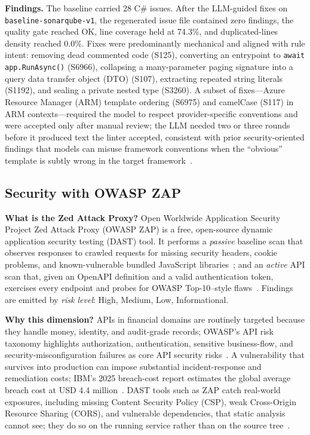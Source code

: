 \documentclass[conference,letterpaper]{IEEEtran}
\begin{document}
\textbf{Findings.} The baseline carried 28 C\# issues. After the LLM-guided fixes on \texttt{baseline-sonarqube-v1}, the regenerated issue file contained zero findings, the quality gate reached \textsc{OK}, line coverage held at 74.3\%, and duplicated-lines density reached 0.0\%. Fixes were predominantly mechanical and aligned with rule intent: removing dead commented code (\textsc{S125}), converting an entrypoint to \texttt{await app.RunAsync()} (\textsc{S6966}), collapsing a many-parameter paging signature into a query data transfer object (DTO) (\textsc{S107}), extracting repeated string literals (\textsc{S1192}), and sealing a private nested type (\textsc{S3260}). A subset of fixes---Azure Resource Manager (ARM) template ordering (\textsc{S6975}) and camelCase (\textsc{S117}) in ARM contexts---required the model to respect provider-specific conventions and were accepted only after manual review; the LLM needed two or three rounds before it produced text the linter accepted, consistent with prior security-oriented findings that models can misuse framework conventions when the ``obvious'' template is subtly wrong in the target framework~\cite{ref6,ref11,ref12}.

\subsection{Security with OWASP ZAP}\label{sec:zap}
\textbf{What is the Zed Attack Proxy?} Open Worldwide Application Security Project Zed Attack Proxy (OWASP ZAP) is a free, open-source dynamic application security testing (DAST) tool. It performs a \emph{passive} baseline scan that observes responses to crawled requests for missing security headers, cookie problems, and known-vulnerable bundled JavaScript libraries~\cite{ref18}; and an \emph{active} API scan that, given an OpenAPI definition and a valid authentication token, exercises every endpoint and probes for OWASP Top-10--style flaws~\cite{ref17,ref19}. Findings are emitted by \emph{risk level}: High, Medium, Low, Informational.

\textbf{Why this dimension?} APIs in financial domains are routinely targeted because they handle money, identity, and audit-grade records; OWASP's API risk taxonomy highlights authorization, authentication, sensitive business-flow, and security-misconfiguration failures as core API security risks~\cite{ref17}. A vulnerability that survives into production can impose substantial incident-response and remediation costs; IBM's 2025 breach-cost report estimates the global average breach cost at USD 4.4 million~\cite{ref22}. DAST tools such as ZAP catch real-world exposures, including missing Content Security Policy (CSP), weak Cross-Origin Resource Sharing (CORS), and vulnerable dependencies, that static analysis cannot see; they do so on the running service rather than on the source tree~\cite{ref18,ref19}.
\end{document}
